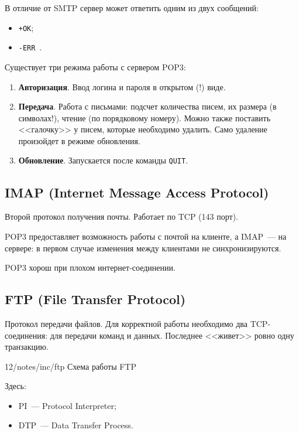 В отличие от SMTP сервер может ответить одним из двух сообщений:

\begin{itemize}
    \item \texttt{+OK};
    \item \texttt{-ERR \underline{\phantom{reason}}}.
\end{itemize}

Существует три режима работы с сервером POP3:

\begin{enumerate}
    \item \textbf{Авторизация}. Ввод логина и пароля в открытом (!) виде.
    \item \textbf{Передача}. Работа с письмами: подсчет количества писем, их размера (в символах!), чтение (по порядковому номеру). Можно также поставить <<галочку>> у писем, которые необходимо удалить. Само удаление произойдет в режиме обновления.
    \item \textbf{Обновление}. Запускается после команды \texttt{QUIT}.
\end{enumerate}

\subsection{IMAP (Internet Message Access Protocol)}

Второй протокол получения почты. Работает по TCP (143 порт).

POP3 предоставляет возможность работы с почтой на клиенте, а IMAP~--- на
сервере: в первом случае изменения между клиентами не синхронизируются.

POP3 хорош при плохом интернет-соединении.

\subsection{FTP (File Transfer Protocol)}

Протокол передачи файлов. Для корректной работы необходимо два TCP-соединения: для передачи команд и данных. Последнее <<живет>> ровно одну транзакцию.

\image
{\textwidth}
{12/notes/inc/ftp}
{Схема работы FTP}

Здесь:

\begin{itemize}
    \item PI~--- Protocol Interpreter;
    \item DTP~--- Data Transfer Process.
\end{itemize}

